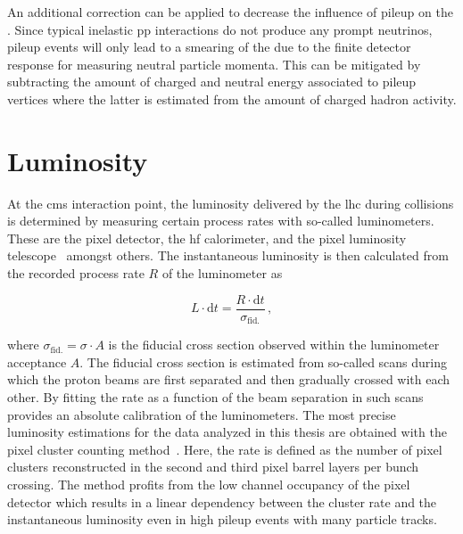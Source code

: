 An additional correction can be applied to decrease the influence of pileup on the \met. Since typical inelastic \gls{pp} interactions do not produce any prompt neutrinos, pileup events will only lead to a smearing of the \met due to the finite detector response for measuring neutral particle momenta. This can be mitigated by subtracting the amount of charged and neutral energy associated to pileup vertices where the latter is estimated from the amount of charged hadron activity.


\section{Luminosity}

At the \gls{cms} interaction point, the luminosity delivered by the \gls{lhc} during collisions is determined by measuring certain process rates with so-called luminometers. These are the pixel detector, the \gls{hf} calorimeter, and the pixel luminosity telescope~\cite{Kornmayer:2039978} amongst others. The instantaneous luminosity is then calculated from the recorded process rate $R$ of the luminometer as

\begin{equation}
L\cdot\mathrm{d}t=\frac{R\cdot\mathrm{d}t}{\sigma_\mathrm{fid.}}\,,
\end{equation}

where $\sigma_\mathrm{fid.}=\sigma\cdot A$ is the fiducial cross section observed within the luminometer acceptance $A$. The fiducial cross section is estimated from so-called  scans during which the proton beams are first separated and then gradually crossed with each other. By fitting the rate as a function of the beam separation in such scans provides an absolute calibration of the luminometers. The most precise luminosity estimations for the data analyzed in this thesis are obtained with the pixel cluster counting method~\cite{CMS-PAS-LUM-13-001,CMS-PAS-LUM-15-001,CMS-PAS-LUM-17-001}. Here, the rate is defined as the number of pixel clusters reconstructed in the second and third pixel barrel layers per bunch crossing. The method profits from the low channel occupancy of the pixel detector which results in a linear dependency between the cluster rate and the instantaneous luminosity even in high pileup events with many particle tracks.

